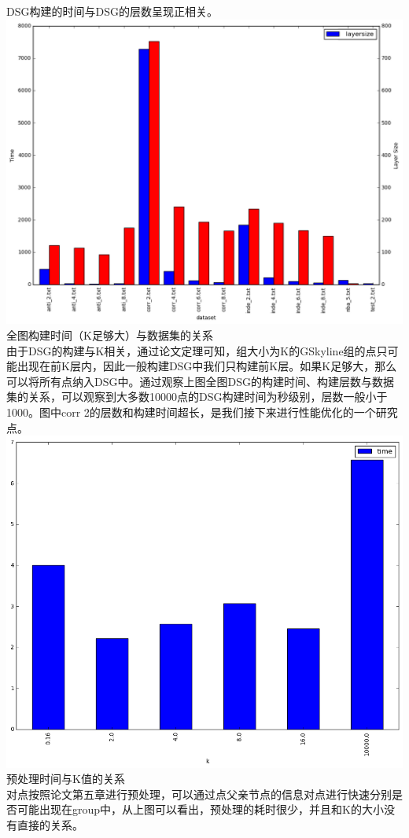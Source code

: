 \documentclass{article}
\begin{document}
\begin{CJK}{UTF8}{gbsn}
DSG构建的时间与DSG的层数呈现正相关。\\
\includegraphics[scale=0.4]{pics/max_layer_building_time.png}
\\
全图构建时间（K足够大）与数据集的关系\\
由于DSG的构建与K相关，通过论文定理可知，组大小为K的GSkyline组的点只可能出现在前K层内，因此一般构建DSG中我们只构建前K层。如果K足够大，那么可以将所有点纳入DSG中。通过观察上图全图DSG的构建时间、构建层数与数据集的关系，可以观察到大多数10000点的DSG构建时间为秒级别，层数一般小于1000。图中corr 2的层数和构建时间超长，是我们接下来进行性能优化的一个研究点。\\
\includegraphics[scale=0.4]{pics/prefilter.png}\\
预处理时间与K值的关系\\
对点按照论文第五章进行预处理，可以通过点父亲节点的信息对点进行快速分别是否可能出现在group中，从上图可以看出，预处理的耗时很少，并且和K的大小没有直接的关系。\\

\end{CJK}
\end{document}
